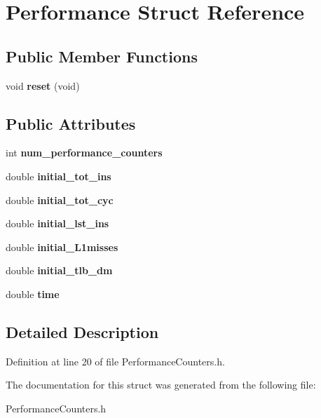 \hypertarget{structPerformance}{\section{Performance Struct Reference}
\label{structPerformance}
}
\subsection*{Public Member Functions}
\begin{DoxyCompactItemize}
\item 
\hypertarget{structPerformance_a487d0bd5f7e07e516faf16def16d847f}{void {\bfseries reset} (void)}\label{structPerformance_a487d0bd5f7e07e516faf16def16d847f}

\end{DoxyCompactItemize}
\subsection*{Public Attributes}
\begin{DoxyCompactItemize}
\item 
\hypertarget{structPerformance_a46b912e5250284e086eae918593ea80d}{int {\bfseries num\-\_\-performance\-\_\-counters}}\label{structPerformance_a46b912e5250284e086eae918593ea80d}

\item 
\hypertarget{structPerformance_ae4f81f358bb251363fd30b1af212e587}{double {\bfseries initial\-\_\-tot\-\_\-ins}}\label{structPerformance_ae4f81f358bb251363fd30b1af212e587}

\item 
\hypertarget{structPerformance_aba1f3bc10aae0d5ee9294b79fbef41c9}{double {\bfseries initial\-\_\-tot\-\_\-cyc}}\label{structPerformance_aba1f3bc10aae0d5ee9294b79fbef41c9}

\item 
\hypertarget{structPerformance_aa22796680433fbf6ea9e7c0b3671e2bc}{double {\bfseries initial\-\_\-lst\-\_\-ins}}\label{structPerformance_aa22796680433fbf6ea9e7c0b3671e2bc}

\item 
\hypertarget{structPerformance_a47d5e630cab47e7db419244884b6c67c}{double {\bfseries initial\-\_\-\-L1misses}}\label{structPerformance_a47d5e630cab47e7db419244884b6c67c}

\item 
\hypertarget{structPerformance_abaa76cc9c0565e882f39ce7e67280c60}{double {\bfseries initial\-\_\-tlb\-\_\-dm}}\label{structPerformance_abaa76cc9c0565e882f39ce7e67280c60}

\item 
\hypertarget{structPerformance_a6ecd82d6779e5862c75ec9978fbcc507}{double {\bfseries time}}\label{structPerformance_a6ecd82d6779e5862c75ec9978fbcc507}

\end{DoxyCompactItemize}


\subsection{Detailed Description}


Definition at line 20 of file Performance\-Counters.\-h.



The documentation for this struct was generated from the following file\-:\begin{DoxyCompactItemize}
\item 
Performance\-Counters.\-h\end{DoxyCompactItemize}
